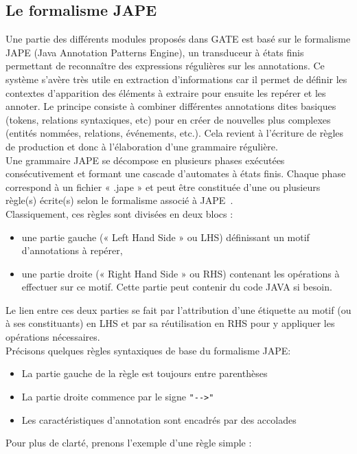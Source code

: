 \documentclass[a4paper, 11pt]{report}
\begin{document}
\subsection{Le formalisme JAPE}
Une partie des différents modules proposés dans GATE est basé sur le formalisme JAPE (Java Annotation Patterns Engine), un transduceur à états finis permettant de reconnaître des expressions régulières sur les annotations. Ce système s'avère très utile en extraction d'informations car il permet de définir les contextes d'apparition des éléments à extraire pour ensuite les repérer et les annoter. Le principe consiste à combiner différentes annotations dites basiques (tokens, relations syntaxiques, etc) pour en créer de nouvelles plus complexes (entités nommées, relations, événements, etc.). Cela revient à l'écriture de règles de production et donc à l'élaboration d'une grammaire régulière.\\
Une grammaire JAPE se décompose en plusieurs phases exécutées consécutivement et formant une cascade d'automates à états finis. Chaque phase correspond à un fichier « .jape » et peut être constituée d'une ou plusieurs règle(s) écrite(s) selon le formalisme associé à JAPE~\cite{SL10}.\\
Classiquement, ces règles sont divisées en deux blocs : 
\begin{itemize}
\item une partie gauche (« Left Hand Side » ou LHS) définissant un motif d'annotations à repérer,
\item une partie droite (« Right Hand Side » ou RHS) contenant les opérations à effectuer sur ce motif. Cette partie peut contenir du code JAVA si besoin.
\end{itemize}
Le lien entre ces deux parties se fait par l'attribution d'une étiquette au motif (ou à ses constituants) en LHS et par sa réutilisation en RHS pour y appliquer les opérations nécessaires.\\
Précisons quelques règles syntaxiques de base du formalisme JAPE:
\begin{itemize}
    \item La partie gauche de la règle est toujours entre parenthèses
    \item La partie droite commence par le signe \verb|"-->"|
    \item Les caractéristiques d'annotation sont encadrés par des accolades
\end{itemize}
Pour plus de clarté, prenons l'exemple d'une règle simple :\\
\end{document}
